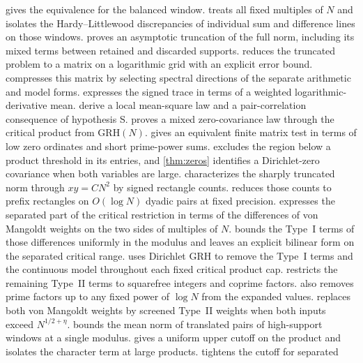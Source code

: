 \documentclass[11pt,a4paper]{article}
\numberwithin{equation}{section}
\newcommand{\grh}{\mathrm{GRH}}
\begin{document}
 gives the equivalence for the balanced window.
 treats all fixed multiples of $N$
and isolates the Hardy--Littlewood discrepancies of individual
sum and difference lines on those windows.
 proves an asymptotic truncation of the full norm, including
its mixed terms between retained and discarded supports.
 reduces the truncated problem to a matrix on a logarithmic
grid with an explicit error bound. 
compresses this matrix by selecting spectral directions of the separate
arithmetic and model forms.  expresses the
signed trace in terms of a weighted logarithmic-derivative mean.
 derive a local
mean-square law and a pair-correlation consequence of hypothesis S.
 proves a mixed zero-covariance law
through the critical product from $\grh(N)$.
 gives an equivalent finite matrix test
in terms of low zero ordinates and short prime-power sums.
 excludes the
region below a product threshold in its entries, and \cref{thm:zeros}
identifies a Dirichlet-zero covariance when both variables are large.
 characterizes the sharply
truncated norm through $xy=CN^2$ by signed rectangle counts.
 reduces those counts to prefix rectangles
on $O(\log N)$ dyadic pairs at fixed precision.
 expresses the separated part
of the critical restriction in terms of the differences of
von Mangoldt weights on the two sides of multiples of $N$.
 bounds the Type~I terms of those
differences uniformly in the modulus and leaves an explicit
bilinear form on the separated critical range.
 uses Dirichlet GRH to remove the
Type~I terms and the continuous model throughout each fixed
critical product cap.
 restricts the remaining
Type~II terms to squarefree integers and coprime factors.
 also removes prime factors
up to any fixed power of $\log N$ from the expanded values.
 replaces both von Mangoldt
weights by screened Type~II weights when both inputs exceed
$N^{1/2+\eta}$.
 bounds the mean norm of translated pairs of
high-support windows at a single modulus.
 gives a uniform upper cutoff on the product
and isolates the character term at large products.
 tightens the cutoff for separated
\end{document}
